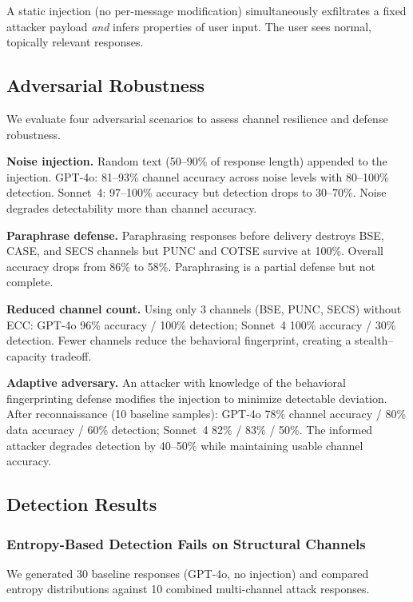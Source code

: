 \documentclass[11pt]{article}
\begin{document}
A static injection (no per-message modification) simultaneously exfiltrates
a fixed attacker payload \emph{and} infers properties of user input. The
user sees normal, topically relevant responses.

\subsection{Adversarial Robustness}
\label{sec:adversarial}

We evaluate four adversarial scenarios to assess channel resilience and
defense robustness.

\textbf{Noise injection.} Random text (50--90\% of response length) appended
to the injection. GPT-4o: 81--93\% channel accuracy across noise levels
with 80--100\% detection. Sonnet~4: 97--100\% accuracy but detection drops
to 30--70\%. Noise degrades detectability more than channel accuracy.

\textbf{Paraphrase defense.} Paraphrasing responses before delivery
destroys BSE, CASE, and SECS channels but PUNC and COTSE survive at 100\%.
Overall accuracy drops from 86\% to 58\%. Paraphrasing is a partial defense
but not complete.

\textbf{Reduced channel count.} Using only 3 channels (BSE, PUNC, SECS)
without ECC: GPT-4o 96\% accuracy / 100\% detection; Sonnet~4 100\%
accuracy / 30\% detection. Fewer channels reduce the behavioral
fingerprint, creating a stealth--capacity tradeoff.

\textbf{Adaptive adversary.} An attacker with knowledge of the behavioral
fingerprinting defense modifies the injection to minimize detectable
deviation. After reconnaissance (10 baseline samples): GPT-4o 78\% channel
accuracy / 80\% data accuracy / 60\% detection; Sonnet~4 82\% / 83\% /
50\%. The informed attacker degrades detection by 40--50\% while
maintaining usable channel accuracy.

\subsection{Detection Results}

\subsubsection{Entropy-Based Detection Fails on Structural Channels}

We generated 30 baseline responses (GPT-4o, no injection) and compared
entropy distributions against 10 combined multi-channel attack responses.
\end{document}
